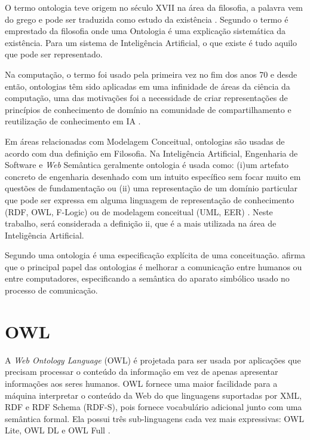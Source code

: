 \documentclass{bcc}
\begin{document}
O termo ontologia teve origem no século XVII na área da filosofia, a palavra vem do grego e pode ser traduzida como estudo da existência \cite{guizzardi2005}. Segundo \cite{gruber1995} o termo é emprestado da filosofia onde uma Ontologia é uma explicação sistemática da existência. Para um sistema de Inteligência Artificial, o que existe é tudo aquilo que pode ser representado.

Na computação, o termo foi usado pela primeira vez no fim dos anos 70 e desde então, ontologias têm sido aplicadas em uma infinidade de áreas da ciência da computação, uma das motivações foi a necessidade de criar representações de princípios de conhecimento de domínio na comunidade de compartilhamento e reutilização de conhecimento em IA \cite{guizzardi2005}.

Em áreas relacionadas com Modelagem Conceitual, ontologias são usadas de acordo com dua definição em Filosofia. Na Inteligência Artificial, Engenharia de Software e \textit{Web} Semântica geralmente ontologia é usada como: (i)um artefato concreto de engenharia desenhado com um intuito específico sem focar muito em questões de fundamentação ou (ii) uma representação de um domínio particular que pode ser expressa em alguma linguagem de representação de conhecimento (RDF, OWL, F-Logic) ou de modelagem conceitual (UML, EER) \cite{guizzardi2008}. Neste trabalho, será considerada a definição ii, que é a mais utilizada na área de Inteligência Artificial.

Segundo \cite{gruber1995} uma ontologia é uma especificação explícita de uma conceituação. \cite{lv2011} afirma que o principal papel das ontologias é melhorar a comunicação entre humanos ou entre computadores, especificando a semântica do aparato simbólico usado no processo de comunicação.

\section{OWL}

A \textit{Web Ontology Language} (OWL) é projetada para ser usada por aplicações que precisam processar o conteúdo da informação em vez de apenas apresentar informações aos seres humanos. OWL fornece uma maior facilidade para a máquina interpretar o conteúdo da Web do que linguagens suportadas por XML, RDF e RDF Schema (RDF-S), pois fornece vocabulário adicional junto com uma semântica formal. Ela possui três sub-linguagens cada vez mais expressivas: OWL Lite, OWL DL e OWL Full \cite{mcguinness}.
\end{document}
